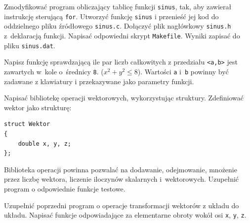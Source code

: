 \begin{myenumerate}
\item Zmodyfikować program obliczający tablicę funkcji \lstinline[style=MyBashStyle]{sinus}, tak, aby zawierał instrukcję sterującą \lstinline[style=MyBashStyle]{for}. Utworzyć funkcję \lstinline[style=MyBashStyle]{sinus} i przenieść jej kod do oddzielnego pliku źródłowego \lstinline[style=MyBashStyle]{sinus.c}. Dołączyć plik nagłówkowy \lstinline[style=MyBashStyle]{sinus.h} z~deklaracją funkcji. Napisać odpowiedni skrypt \lstinline[style=MyBashStyle]{Makefile}. Wyniki zapisać do pliku \lstinline[style=MyBashStyle]{sinus.dat}.
\item Napisz funkcję sprawdzającą ile par liczb całkowitych z przedziału \lstinline[style=MyBashStyle]{<a,b>} jest zawartych w~kole o~średnicy \lstinline[style=MyBashStyle]{8}. ($x^2+y^2\leq 8$). Wartości \lstinline[style=MyBashStyle]{a} i~\lstinline[style=MyBashStyle]{b} powinny być zadawane z klawiatury i przekazywane jako parametry funkcji.
\item Napisać bibliotekę operacji wektorowych, wykorzystując struktury. Zdefiniować wektor jako strukturę:

\begin{lstlisting}[style=MyCStyle]
struct Wektor
{
	double x, y, z;
};
\end{lstlisting}

Biblioteka operacji powinna pozwalać na dodawanie, odejmowanie, mnożenie przez liczbę wektora, liczenie iloczynów skalarnych i~wektorowych. Uzupełnić program  o odpowiednie funkcje testowe.
\item Uzupełnić poprzedni program o operacje transformacji wektorów z układu do układu. Napisać funkcje odpowiadające za elementarne obroty wokół osi \lstinline[style=MyBashStyle]{x}, \lstinline[style=MyBashStyle]{y}, \lstinline[style=MyBashStyle]{z}.
\end{myenumerate}




\cleardoublepage
